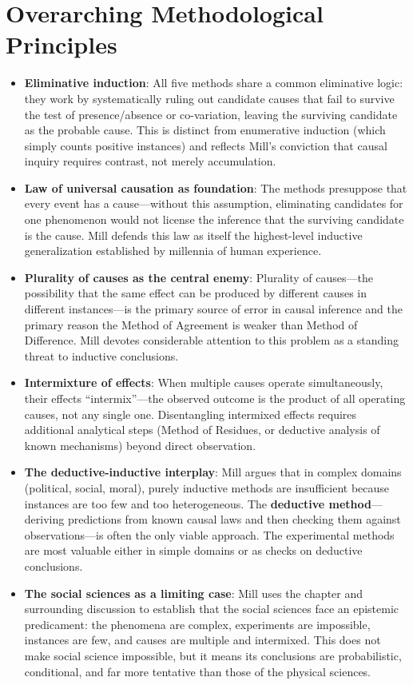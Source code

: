 \documentclass[12pt]{article}
\begin{document}
\section{Overarching Methodological Principles}

\begin{itemize}[leftmargin=*, itemsep=4pt]
    \item \textbf{Eliminative induction}: All five methods share a common eliminative logic: they work by systematically ruling out candidate causes that fail to survive the test of presence/absence or co-variation, leaving the surviving candidate as the probable cause. This is distinct from enumerative induction (which simply counts positive instances) and reflects Mill's conviction that causal inquiry requires contrast, not merely accumulation.
    \item \textbf{Law of universal causation as foundation}: The methods presuppose that every event has a cause---without this assumption, eliminating candidates for one phenomenon would not license the inference that the surviving candidate is the cause. Mill defends this law as itself the highest-level inductive generalization established by millennia of human experience.
    \item \textbf{Plurality of causes as the central enemy}: Plurality of causes---the possibility that the same effect can be produced by different causes in different instances---is the primary source of error in causal inference and the primary reason the Method of Agreement is weaker than Method of Difference. Mill devotes considerable attention to this problem as a standing threat to inductive conclusions.
    \item \textbf{Intermixture of effects}: When multiple causes operate simultaneously, their effects ``intermix''---the observed outcome is the product of all operating causes, not any single one. Disentangling intermixed effects requires additional analytical steps (Method of Residues, or deductive analysis of known mechanisms) beyond direct observation.
    \item \textbf{The deductive-inductive interplay}: Mill argues that in complex domains (political, social, moral), purely inductive methods are insufficient because instances are too few and too heterogeneous. The \textbf{deductive method}---deriving predictions from known causal laws and then checking them against observations---is often the only viable approach. The experimental methods are most valuable either in simple domains or as checks on deductive conclusions.
    \item \textbf{The social sciences as a limiting case}: Mill uses the chapter and surrounding discussion to establish that the social sciences face an epistemic predicament: the phenomena are complex, experiments are impossible, instances are few, and causes are multiple and intermixed. This does not make social science impossible, but it means its conclusions are probabilistic, conditional, and far more tentative than those of the physical sciences.
\end{itemize}
\end{document}
